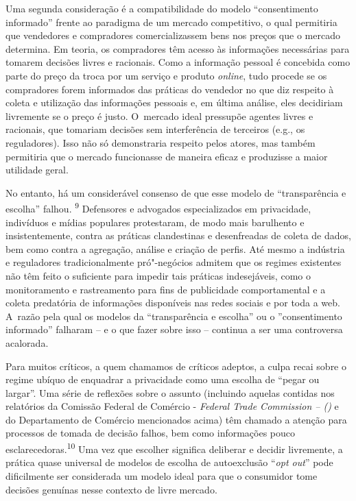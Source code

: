 Uma segunda consideração é a compatibilidade do modelo ``consentimento
informado'' frente ao paradigma de um mercado competitivo, o qual
permitiria que vendedores e compradores comercializassem bens nos preços
que o mercado determina. Em teoria, os compradores têm acesso às
informações necessárias para tomarem decisões livres e racionais. Como a
informação pessoal é concebida como parte do preço da troca por um
serviço e produto \emph{online}, tudo procede se os compradores forem
informados das práticas do vendedor no que diz respeito à coleta e
utilização das informações pessoais e, em última análise, eles
decidiriam livremente se o preço é justo. O~mercado ideal pressupõe
agentes livres e racionais, que tomariam decisões sem interferência de
terceiros (e.g., os reguladores). Isso não só demonstraria respeito
pelos atores, mas também permitiria que o mercado funcionasse de maneira
eficaz e produzisse a maior utilidade geral.

No entanto, há um considerável consenso de que esse modelo de
``transparência e escolha'' falhou. \textsuperscript{{9}} Defensores e
advogados especializados em privacidade, indivíduos e mídias populares
protestaram, de modo mais barulhento e insistentemente, contra as
práticas clandestinas e desenfreadas de coleta de dados, bem como contra
a agregação, análise e criação de perfis. Até mesmo a indústria e
reguladores tradicionalmente pró"-negócios admitem que os regimes
existentes não têm feito o suficiente para impedir tais práticas
indesejáveis, como o monitoramento e rastreamento para fins de
publicidade comportamental e a coleta predatória de informações
disponíveis nas redes sociais e por toda a web. A~razão pela qual os
modelos da ``transparência e escolha'' ou o ''consentimento informado''
falharam -- e o que fazer sobre isso -- continua a ser uma controversa
acalorada.

Para muitos críticos, a quem chamamos de críticos adeptos, a culpa recai
sobre o regime ubíquo de enquadrar a privacidade como uma escolha de
``pegar ou largar''. Uma série de reflexões sobre o assunto (incluindo
aquelas contidas nos relatórios da Comissão Federal de Comércio -
\emph{Federal Trade Commission -- ()} e do Departamento de Comércio
mencionados acima) têm chamado a atenção para processos de tomada de
decisão falhos, bem como informações pouco
esclarecedoras.\textsuperscript{{10}} Uma vez que escolher significa
deliberar e decidir livremente, a prática quase universal de modelos de
escolha de autoexclusão ``\emph{opt out}'' pode dificilmente ser
considerada um modelo ideal para que o consumidor tome decisões genuínas
nesse contexto de livre mercado.

